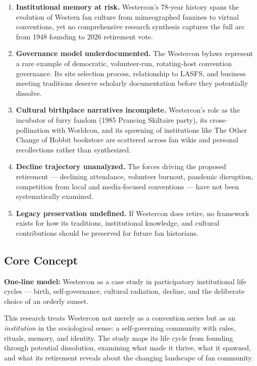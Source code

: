 \documentclass[11pt,letterpaper]{article}
\begin{document}
\begin{enumerate}[leftmargin=2em]
  \item \textbf{Institutional memory at risk.} Westercon's 78-year history spans the evolution of Western fan culture from mimeographed fanzines to virtual conventions, yet no comprehensive research synthesis captures the full arc from 1948 founding to 2026 retirement vote.
  \item \textbf{Governance model underdocumented.} The Westercon bylaws represent a rare example of democratic, volunteer-run, rotating-host convention governance. Its site selection process, relationship to LASFS, and business meeting traditions deserve scholarly documentation before they potentially dissolve.
  \item \textbf{Cultural birthplace narratives incomplete.} Westercon's role as the incubator of furry fandom (1985 Prancing Skiltaire party), its cross-pollination with Worldcon, and its spawning of institutions like The Other Change of Hobbit bookstore are scattered across fan wikis and personal recollections rather than synthesized.
  \item \textbf{Decline trajectory unanalyzed.} The forces driving the proposed retirement --- declining attendance, volunteer burnout, pandemic disruption, competition from local and media-focused conventions --- have not been systematically examined.
  \item \textbf{Legacy preservation undefined.} If Westercon does retire, no framework exists for how its traditions, institutional knowledge, and cultural contributions should be preserved for future fan historians.
\end{enumerate}

\subsection{Core Concept}

\begin{quotebox}
\textbf{One-line model:} Westercon as a case study in participatory institutional life cycles --- birth, self-governance, cultural radiation, decline, and the deliberate choice of an orderly sunset.
\end{quotebox}

This research treats Westercon not merely as a convention series but as an \emph{institution} in the sociological sense: a self-governing community with rules, rituals, memory, and identity. The study maps its life cycle from founding through potential dissolution, examining what made it thrive, what it spawned, and what its retirement reveals about the changing landscape of fan community.
\end{document}
